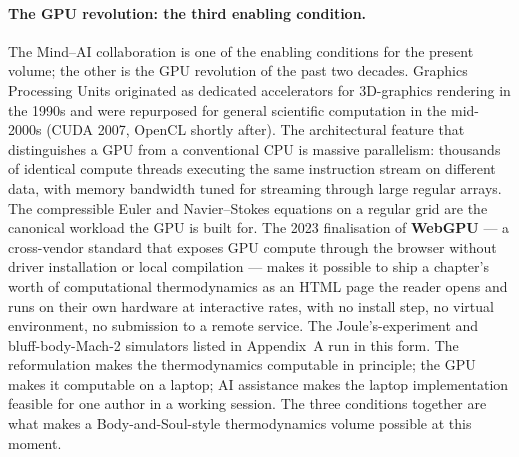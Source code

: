 \paragraph{The GPU revolution: the third enabling condition.}
The Mind--AI collaboration is one of the enabling conditions for the present volume; the other is the GPU revolution of the past two decades. Graphics Processing Units originated as dedicated accelerators for 3D-graphics rendering in the 1990s and were repurposed for general scientific computation in the mid-2000s (CUDA 2007, OpenCL shortly after). The architectural feature that distinguishes a GPU from a conventional CPU is massive parallelism: thousands of identical compute threads executing the same instruction stream on different data, with memory bandwidth tuned for streaming through large regular arrays. The compressible Euler and Navier--Stokes equations on a regular grid are the canonical workload the GPU is built for. The 2023 finalisation of \textbf{WebGPU} --- a cross-vendor standard that exposes GPU compute through the browser without driver installation or local compilation --- makes it possible to ship a chapter's worth of computational thermodynamics as an HTML page the reader opens and runs on their own hardware at interactive rates, with no install step, no virtual environment, no submission to a remote service. The Joule's-experiment and bluff-body-Mach-2 simulators listed in Appendix~A run in this form. The reformulation makes the thermodynamics computable in principle; the GPU makes it computable on a laptop; AI assistance makes the laptop implementation feasible for one author in a working session. The three conditions together are what makes a Body-and-Soul-style thermodynamics volume possible at this moment.

